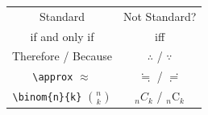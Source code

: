 \documentclass[preview]{standalone}
\newcommand{\tA}[1]{\textcolor{cA}{#1}}
\newcommand{\tC}[1]{\textcolor{cC}{#1}}
\begin{document}
\begin{table}[h]
	\centering
	\begin{tabular}{cc}
		\tA{Standard}                      & \tC{Not Standard?}                 \\
		if and only if                     & iff                                \\
		Therefore / Because                & $\therefore$ / $\because$          \\
		\verb|\approx| $\approx$           & $\fallingdotseq$ / $\risingdotseq$ \\
		\verb|\binom{n}{k}| $\binom{n}{k}$ & ${}_n C_k$ / ${}_n \mathrm{C}_k$   \\
	\end{tabular}
\end{table}
\end{document}
